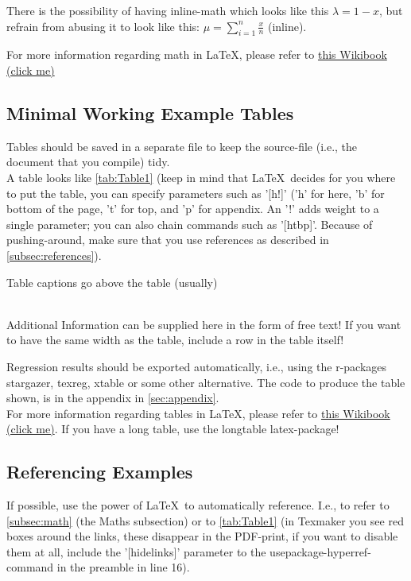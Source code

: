 \documentclass[12pt,a4paper]{article}
\begin{document}
There is the possibility of having inline-math which looks like this $\lambda = 1 - x$, but refrain from abusing it to look like this: $\mu = \displaystyle \sum_{i = 1}^{n} \frac{x}{n}$ (inline).

For more information regarding math in \LaTeX, please refer to \href{https://en.wikibooks.org/wiki/LaTeX/Mathematics}{this Wikibook (click me)}

\subsection{Minimal Working Example Tables}
Tables should be saved in a separate file to keep the source-file (i.e., the document that you compile) tidy.\\

A table looks like \autoref{tab:Table1} (keep in mind that \LaTeX \ decides for you where to put the table, you can specify parameters such as '[h!]' ('h' for here, 'b' for bottom of the page, 't' for top, and 'p' for appendix. An '!' adds weight to a single parameter; you can also chain commands such as '[htbp]'. Because of pushing-around, make sure that you use references as described in \autoref{subsec:references}). \\

\begin{table}[h!]
\centering
\caption{Table captions go above the table (usually)}
\label{tab:Table1}
\\
\bigskip
\small Additional Information can be supplied here in the form of free text! If you want to have the same width as the table, include a row in the table itself!
\end{table}

Regression results should be exported automatically, i.e., using the r-packages stargazer, texreg, xtable or some other alternative. The code to produce the table shown, is in the appendix in \autoref{sec:appendix}. \\

For more information regarding tables in \LaTeX, please refer to \href{https://en.wikibooks.org/wiki/LaTeX/Tables}{this Wikibook (click me)}. If you have a long table, use the longtable latex-package!
\newpage

\subsection{Referencing Examples}
\label{subsec:references}
If possible, use the power of \LaTeX \ to automatically reference. I.e., to refer to \autoref{subsec:math} (the Maths subsection) or to \autoref{tab:Table1} (in Texmaker you see red boxes around the links, these disappear in the PDF-print, if you want to disable them at all, include the '[hidelinks]' parameter to the usepackage-hyperref-command in the preamble in line 16).
\end{document}
